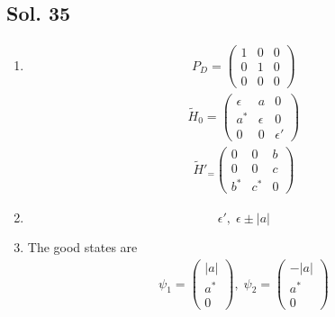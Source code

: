 \subsection*{Sol. 35}
\begin{enumerate}
    \item 
    \begin{align*}
        P_D = \begin{pmatrix}
            1 & 0 & 0\\
            0 & 1 & 0 \\
            0 & 0 & 0
        \end{pmatrix}
    \end{align*}
    \begin{align*}
        \tilde H_0 = \begin{pmatrix}
            \epsilon& a & 0\\
            a^* & \epsilon  & 0\\
            0 & 0 & \epsilon'
        \end{pmatrix}
    \end{align*}
    \begin{align*}
        \tilde H'_ = \begin{pmatrix}
            0 & 0 & b\\
            0 & 0 & c\\
            b^* & c^* & 0
        \end{pmatrix}
    \end{align*}
    \item 
    $$
    \epsilon', \; \epsilon\pm |a|
    $$
    \item 
    The good states are 
    \begin{align*}
        \psi_1 = \begin{pmatrix}
            |a|\\
            a^*\\
            0
        \end{pmatrix},\;
        \psi_2 = 
        \begin{pmatrix}
            -|a|\\
            a^*\\
            0
        \end{pmatrix}
    \end{align*}
\end{enumerate}

